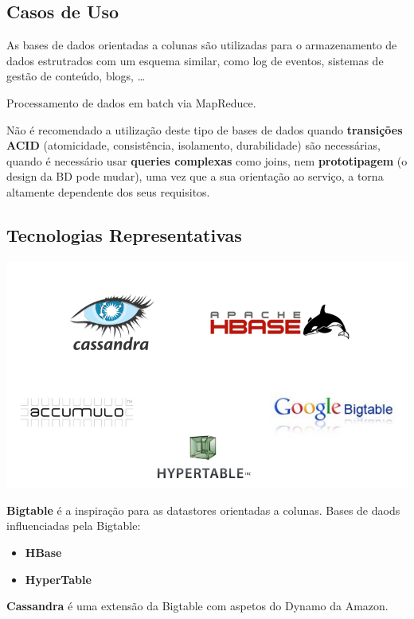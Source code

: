 \documentclass{article}
\begin{document}
\subsection{Casos de Uso}

As bases de dados orientadas a colunas são utilizadas para o armazenamento de
dados estrutrados com um esquema similar, como log de eventos, sistemas de
gestão de conteúdo, blogs, \dots

Processamento de dados em batch via MapReduce.

\vspace{2mm}

Não é recomendado a utilização deste tipo de bases de dados quando
\textbf{transições ACID} (atomicidade, consistência, isolamento, durabilidade) são necessárias,
quando é necessário usar \textbf{queries complexas} como joins, nem \textbf{prototipagem} (o design da BD pode mudar), uma vez que a
sua orientação ao serviço, a torna altamente dependente dos seus requisitos.

\subsection{Tecnologias Representativas}

\begin{center}
  \includegraphics[scale=0.3]{12}
\end{center}

\textbf{Bigtable} é a inspiração para as datastores orientadas a colunas.
Bases de daods influenciadas pela Bigtable:
\begin{itemize}
  \item \textbf{HBase}
  \item \textbf{HyperTable}
\end{itemize}

\textbf{Cassandra} é uma extensão da Bigtable com aspetos do Dynamo da Amazon.
\end{document}
